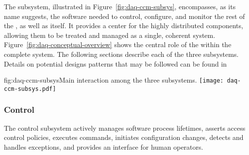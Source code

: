 
The  subsystem, illustrated in Figure~\ref{fig:daq-ccm-subsys}, encompasses, as its name suggests, the software needed to control, configure, and monitor the rest of the , as well as itself. 
It provides a center for the highly distributed  components, allowing them to be treated and managed as a single, coherent system. 
Figure~\ref{fig:daq-conceptual-overview} shows the central role of the  within the complete  system.
The following sections describe each of the three  subsystems. 
Details on potential designs patterns that may be followed can be found in~ 

\begin{dunefigure}{fig:daq-ccm-subsys}{Main interaction among the three  subsystems.}
  \texttt{[image: daq-ccm-subsys.pdf]}
\end{dunefigure}

\subsubsection{Control}
\label{sec:daq:design:ccm:control}


The  control subsystem actively manages  software process lifetimes, asserts access control policies, executes commands, initiates configuration changes, detects and handles exceptions, and provides an interface for human operators.


